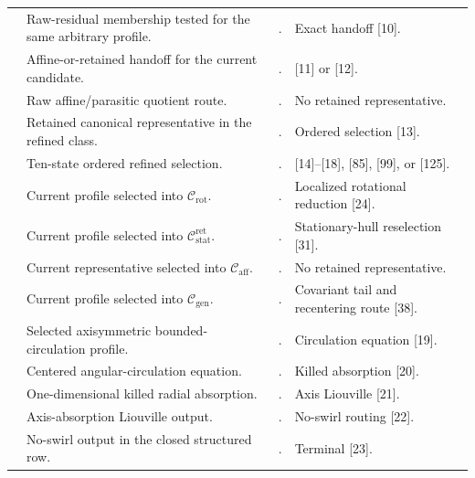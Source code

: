 \documentclass[11pt]{amsart}
\numberwithin{equation}{section}
\theoremstyle{plain}
\theoremstyle{definition}
\theoremstyle{remark}
\newcommand{\Crot}{\mathcal C_{\mathrm{rot}}}
\newcommand{\Cstat}{\mathcal C_{\mathrm{stat}}^{\mathrm{ret}}}
\newcommand{\Caff}{\mathcal C_{\mathrm{aff}}}
\newcommand{\Cgen}{\mathcal C_{\mathrm{gen}}}
\begin{document}
\begin{longtable}{@{}L{0.06\textwidth}L{0.25\textwidth}L{0.40\textwidth}L{0.21\textwidth}@{}}
\relax
[9] & Raw-residual membership tested for the same arbitrary profile. &
. &
Exact handoff [10].\\
\relax
[10] & Affine-or-retained handoff for the current candidate. &
. &
[11] or [12].\\
\relax
[11] & Raw affine/parasitic quotient route. &
. &
No retained representative.\\
\relax
[12] & Retained canonical representative in the refined class. &
. &
Ordered selection [13].\\
\relax
[13] & Ten-state ordered refined selection. &
. &
[14]--[18], [85], [99], or [125].\\
\relax
[14] & Current profile selected into \(\Crot\). &
. &
Localized rotational reduction [24].\\
\relax
[15] & Current profile selected into \(\Cstat\). &
. &
Stationary-hull reselection [31].\\
\relax
[16] & Current representative selected into \(\Caff\). &
. &
No retained representative.\\
\relax
[17] & Current profile selected into \(\Cgen\). &
. &
Covariant tail and recentering route [38].\\
\relax
[18] & Selected axisymmetric bounded-circulation profile. &
. & Circulation equation [19].\\
\relax
[19] & Centered angular-circulation equation. &
. & Killed absorption [20].\\
\relax
[20] & One-dimensional killed radial absorption. &
. & Axis Liouville [21].\\
\relax
[21] & Axis-absorption Liouville output. &
. & No-swirl routing [22].\\
\relax
[22] & No-swirl output in the closed structured row. &
. & Terminal [23].\\

\end{longtable}
\end{document}
